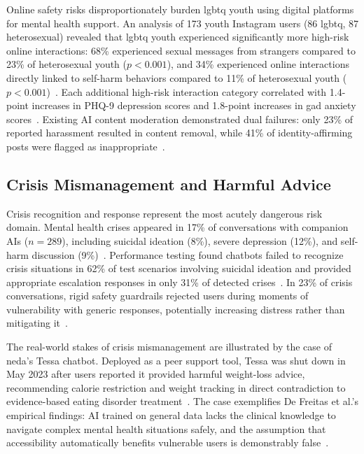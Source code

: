 Online safety risks disproportionately burden \gls{lgbtq} youth using digital platforms for mental health support. An analysis of 173 youth Instagram users (86 \gls{lgbtq}, 87 heterosexual) revealed that \gls{lgbtq} youth experienced significantly more high-risk online interactions: 68\% experienced sexual messages from strangers compared to 23\% of heterosexual youth ($p < 0.001$), and 34\% experienced online interactions directly linked to self-harm behaviors compared to 11\% of heterosexual youth ($p < 0.001$)~\cite{tanni_2024}. Each additional high-risk interaction category correlated with 1.4-point increases in PHQ-9 depression scores and 1.8-point increases in \gls{gad} anxiety scores~\cite{tanni_2024}. Existing AI content moderation demonstrated dual failures: only 23\% of reported harassment resulted in content removal, while 41\% of identity-affirming posts were flagged as inappropriate~\cite{tanni_2024}.

\subsection{Crisis Mismanagement and Harmful Advice}

Crisis recognition and response represent the most acutely dangerous risk domain. Mental health crises appeared in 17\% of conversations with companion AIs ($n = 289$), including suicidal ideation (8\%), severe depression (12\%), and self-harm discussion (9\%)~\cite{de_freitas_2024}. Performance testing found chatbots failed to recognize crisis situations in 62\% of test scenarios involving suicidal ideation and provided appropriate escalation responses in only 31\% of detected crises~\cite{de_freitas_2024}. In 23\% of crisis conversations, rigid safety guardrails rejected users during moments of vulnerability with generic responses, potentially increasing distress rather than mitigating it~\cite{de_freitas_2024}.

The real-world stakes of crisis mismanagement are illustrated by the case of \gls{neda}'s Tessa chatbot. Deployed as a peer support tool, Tessa was shut down in May 2023 after users reported it provided harmful weight-loss advice, recommending calorie restriction and weight tracking in direct contradiction to evidence-based eating disorder treatment~\cite{neda_2023}. The case exemplifies De Freitas et al.'s empirical findings: AI trained on general data lacks the clinical knowledge to navigate complex mental health situations safely, and the assumption that accessibility automatically benefits vulnerable users is demonstrably false~\cite{de_freitas_2024}.

